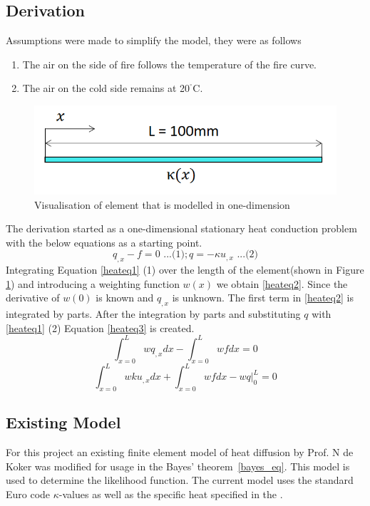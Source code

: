 	\subsection{Derivation}%
	
	Assumptions were made to simplify the model, they were as follows
	\begin{enumerate}
\item{The air on the side of fire follows the temperature of the fire curve.}
\item{The air on the cold side remains at 20$^{^\circ}$C.}
	\end{enumerate}
	\begin{figure}[H]
	\label{femfig}
	\centering
	\includegraphics[width = 0.75\linewidth]{figures/fem_sketch.png}
	\caption{Visualisation of element that is modelled in one-dimension}
	\end{figure}
	The derivation started as a one-dimensional stationary heat conduction problem with the below equations as a starting point.
	\begin{equation}
	\label{heateq1}
	q_{,x}-f = 0  \text{  ...(1)} ; q = -\kappa u_{,x} \text{  ...(2)} 
	\end{equation}
	Integrating Equation \ref{heateq1} (1) over the length of the element(shown in Figure \ref{femfig}) and introducing a weighting function $w(x)$ we obtain \ref{heateq2}. 
	Since the derivative of $w(0)$ is known and $q_{,x}$ is unknown. 
	The first term in \ref{heateq2} is integrated by parts. 
	After the integration by parts and substituting $q$ with \ref{heateq1} (2) Equation \ref{heateq3} is created.
	\begin{equation}
	\label{heateq2}
	\int_{x=0}^L wq_{,x}dx - \int_{x=0}^L wfdx = 0
	\end{equation}
	\begin{equation}
	\label{heateq3}
	\int_{x=0}^L wku_{,x}dx + \int_{x=0}^L wfdx - \left.wq\right|_0^L = 0
	\end{equation}
	\subsection{Existing Model}
	For this project an existing finite element model of heat diffusion by Prof. N de Koker was modified for usage in the Bayes' theorem~\ref{bayes_eq}. 
	This model is used to determine the likelihood function. 
	The current model uses the standard Euro code $\kappa$-values as well as the specific heat specified in the \citep{Euro:2004}. 
	
